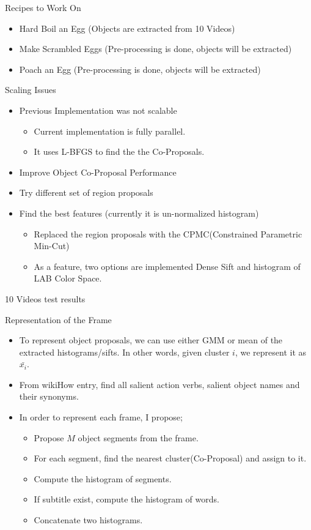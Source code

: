 \begin{frame}{Recipes to Work On}
\begin{itemize}
\item Hard Boil an Egg‏‎ (Objects are extracted from 10 Videos)
\item Make Scrambled Eggs‏‎ (Pre-processing is done, objects will be extracted)
\item Poach an Egg‏‎ (Pre-processing is done, objects will be extracted)
\end{itemize}
\end{frame}

\begin{frame}{Scaling Issues}
\begin{itemize}
\item Previous Implementation was not scalable
\begin{itemize}
\item Current implementation is fully parallel.
\item It uses L-BFGS to find the the Co-Proposals.
\end{itemize}
\item Improve Object Co-Proposal Performance
\item Try different set of region proposals
\item Find the best features (currently it is un-normalized histogram)
\begin{itemize}
\item Replaced the region proposals with the CPMC(Constrained Parametric Min-Cut)
\item As a feature, two options are implemented Dense Sift and histogram of LAB Color Space.
\end{itemize}
\end{itemize}
10 Videos test results
\end{frame}


\begin{frame}{Representation of the Frame}
\begin{itemize}
\item To represent object proposals, we can use either GMM or mean of the extracted histograms/sifts. In other words, given cluster $i$, we represent it as $\bar{x_i}$.
\item From wikiHow entry, find all salient action verbs, salient object names and their synonyms. 
\item In order to represent each frame, I propose;
\begin{itemize}
\item Propose $M$ object segments from the frame.
\item For each segment, find the nearest cluster(Co-Proposal) and assign to it.
\item Compute the histogram of segments.
\item If subtitle exist, compute the histogram of words.
\item Concatenate two histograms.
\end{itemize}
\end{itemize}
\end{frame}

